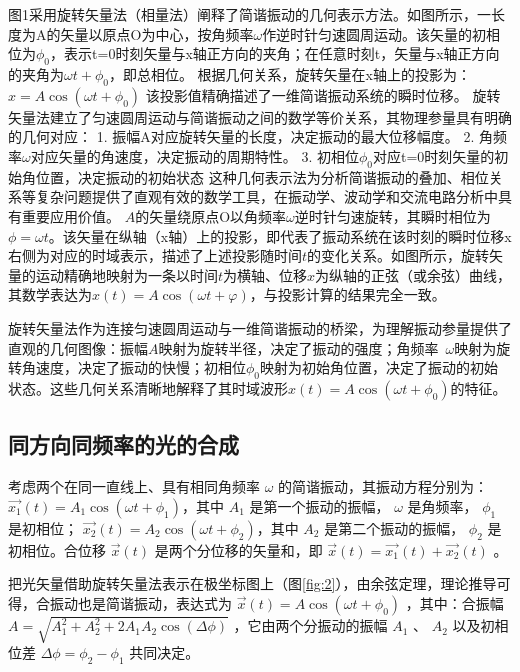 \documentclass[withoutpreface,bwprint]{cumcmthesis} %
\begin{document}
\begin{appendices}
    图1采用旋转矢量法（相量法）阐释了简谐振动的几何表示方法。如图所示，一长度为A的矢量以原点O为中心，按角频率$\omega$作逆时针匀速圆周运动。该矢量的初相位为$\phi_0$，表示t=0时刻矢量与x轴正方向的夹角；在任意时刻t，矢量与x轴正方向的夹角为$\omega t+\phi_0$，即总相位。
    根据几何关系，旋转矢量在x轴上的投影为： $x=A\cos(\omega t+\phi_0)$
    该投影值精确描述了一维简谐振动系统的瞬时位移。
    旋转矢量法建立了匀速圆周运动与简谐振动之间的数学等价关系，其物理参量具有明确的几何对应：
    1.	振幅A对应旋转矢量的长度，决定振动的最大位移幅度。
    2.	角频率$\omega$对应矢量的角速度，决定振动的周期特性。
    3.	初相位$\phi_0$对应t=0时刻矢量的初始角位置，决定振动的初始状态
    这种几何表示法为分析简谐振动的叠加、相位关系等复杂问题提供了直观有效的数学工具，在振动学、波动学和交流电路分析中具有重要应用价值。
    $A$的矢量绕原点O以角频率$\omega$逆时针匀速旋转，其瞬时相位为$\phi=\omega t$。该矢量在纵轴（x轴）上的投影，即代表了振动系统在该时刻的瞬时位移x右侧为对应的时域表示，描述了上述投影随时间$t$的变化关系。如图所示，旋转矢量的运动精确地映射为一条以时间$t$为横轴、位移$x$为纵轴的正弦（或余弦）曲线，其数学表达为$x(t)=A\cos(\omega t+\varphi)$，与投影计算的结果完全一致。

    旋转矢量法作为连接匀速圆周运动与一维简谐振动的桥梁，为理解振动参量提供了直观的几何图像：振幅$A$映射为旋转半径，决定了振动的强度；角频率 $\omega$映射为旋转角速度，决定了振动的快慢；初相位$\phi_0$映射为初始角位置，决定了振动的初始状态。这些几何关系清晰地解释了其时域波形$x(t)=A\cos(\omega t+\phi_0)$的特征。

    \subsection{同方向同频率的光的合成}
    考虑两个在同一直线上、具有相同角频率 $\omega$ 的简谐振动，其振动方程分别为：
    $ \overrightarrow{x_1}(t) = A_1 \cos(\omega t + \phi_{1})$，其中 $A_1$ 是第一个振动的振幅， $\omega$ 是角频率， $\phi_{1}$ 是初相位；
    $\overrightarrow{x_2}(t) = A_2 \cos(\omega t + \phi_{2})$，其中 $A_2$ 是第二个振动的振幅， $\phi_{2}$ 是初相位。合位移 $\overrightarrow{x}(t)$ 是两个分位移的矢量和，即 $\overrightarrow{x}(t) = \overrightarrow{x_1}(t) + \overrightarrow{x_2}(t)$ 。

    把光矢量借助旋转矢量法表示在极坐标图上（图\ref{fig:2}），由余弦定理，理论推导可得，合振动也是简谐振动，表达式为 $\overrightarrow{x}(t) = A \cos(\omega t + \phi_0)$ ，其中：合振幅 $A = \sqrt{A_1^2 + A_2^2 + 2 A_1 A_2 \cos(\Delta \phi)}$ ，它由两个分振动的振幅 $A_1$ 、 $A_2$ 以及初相位差 $\Delta \phi = \phi_{2} - \phi_{1}$ 共同决定。


\end{appendices}
\end{document}
